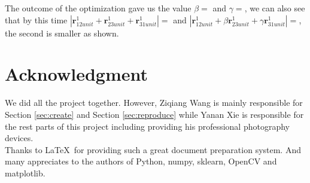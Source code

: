 \documentclass[10pt,twocolumn,letterpaper]{article}
\begin{document}
The outcome of the optimization gave us the value  $\beta = $ and $\gamma = $, we can also see that by this time $| \textbf{r}_{12unit}^{1} +  \textbf{r}_{23unit}^{1} +  \textbf{r}_{31unit}^{1} | = $ and $| \textbf{r}_{12unit}^{1} + \beta  \textbf{r}_{23unit}^{1} + \gamma  \textbf{r}_{31unit}^{1} | = $, the second is smaller as shown.


\section{Acknowledgment}
We did all the project together. However, Ziqiang Wang is mainly responsible for
Section \ref{sec:create} and Section \ref{sec:reproduce} while Yanan Xie is responsible for the rest parts of this project including providing his professional photography devices.\\

Thanks to \LaTeX\ for providing such a great document preparation system. And many appreciates to the authors of Python, numpy, sklearn, OpenCV and matplotlib.\\
\end{document}
